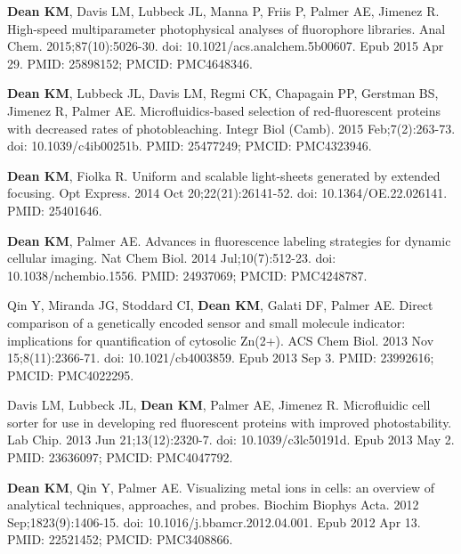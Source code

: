 \begin{etaremune}
\item \textbf{Dean KM}, Davis LM, Lubbeck JL, Manna P, Friis P, Palmer AE, Jimenez R. High-speed multiparameter photophysical analyses of fluorophore libraries. Anal Chem. 2015;87(10):5026-30. doi: 10.1021/acs.analchem.5b00607. Epub 2015 Apr 29. PMID: 25898152; PMCID: PMC4648346.

\item \textbf{Dean KM}, Lubbeck JL, Davis LM, Regmi CK, Chapagain PP, Gerstman BS, Jimenez R, Palmer AE. Microfluidics-based selection of red-fluorescent proteins with decreased rates of photobleaching. Integr Biol (Camb). 2015 Feb;7(2):263-73. doi: 10.1039/c4ib00251b. PMID: 25477249; PMCID: PMC4323946.

\item \textbf{Dean KM}, Fiolka R. Uniform and scalable light-sheets generated by extended focusing. Opt Express. 2014 Oct 20;22(21):26141-52. doi: 10.1364/OE.22.026141. PMID: 25401646.

\item \textbf{Dean KM}, Palmer AE. Advances in fluorescence labeling strategies for dynamic cellular imaging. Nat Chem Biol. 2014 Jul;10(7):512-23. doi: 10.1038/nchembio.1556. PMID: 24937069; PMCID: PMC4248787.

\item Qin Y, Miranda JG, Stoddard CI, \textbf{Dean KM}, Galati DF, Palmer AE. Direct comparison of a genetically encoded sensor and small molecule indicator: implications for quantification of cytosolic Zn(2+). ACS Chem Biol. 2013 Nov 15;8(11):2366-71. doi: 10.1021/cb4003859. Epub 2013 Sep 3. PMID: 23992616; PMCID: PMC4022295.

\item Davis LM, Lubbeck JL, \textbf{Dean KM}, Palmer AE, Jimenez R. Microfluidic cell sorter for use in developing red fluorescent proteins with improved photostability. Lab Chip. 2013 Jun 21;13(12):2320-7. doi: 10.1039/c3lc50191d. Epub 2013 May 2. PMID: 23636097; PMCID: PMC4047792.

\item \textbf{Dean KM}, Qin Y, Palmer AE. Visualizing metal ions in cells: an overview of analytical techniques, approaches, and probes. Biochim Biophys Acta. 2012 Sep;1823(9):1406-15. doi: 10.1016/j.bbamcr.2012.04.001. Epub 2012 Apr 13. PMID: 22521452; PMCID: PMC3408866.


\end{etaremune}
